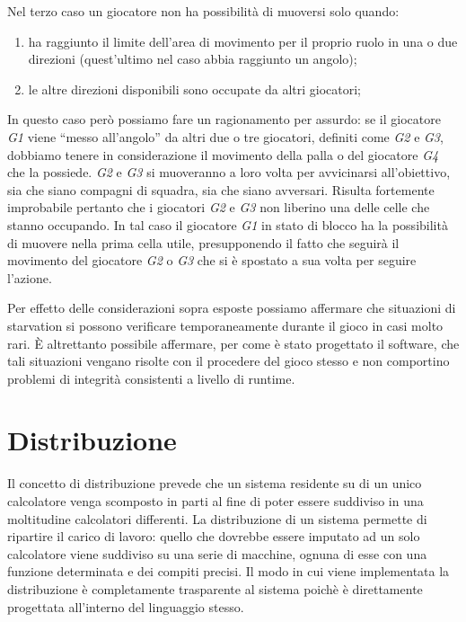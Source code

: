 \documentclass[aps,letterpaper,10pt]{article}
\begin{document}
Nel terzo caso un giocatore non ha possibilit\`a di muoversi solo quando:

\begin{enumerate}
	\item ha raggiunto il limite dell'area di movimento per il proprio ruolo in una o due direzioni (quest'ultimo nel caso abbia raggiunto un angolo);
	\item le altre direzioni disponibili sono occupate da altri giocatori; 
\end{enumerate}

In questo caso per\`o possiamo fare un ragionamento per assurdo: se il giocatore \emph{G1} viene ``messo all'angolo'' da altri due o tre giocatori, definiti come \emph{G2} e \emph{G3}, dobbiamo tenere in considerazione il movimento della palla o del giocatore \emph{G4} che la possiede. \emph{G2} e \emph{G3} si muoveranno a loro volta per avvicinarsi all'obiettivo, sia che siano compagni di squadra, sia che siano avversari. Risulta fortemente improbabile pertanto che i giocatori \emph{G2} e \emph{G3} non liberino una delle celle che stanno occupando. In tal caso il giocatore \emph{G1} in stato di blocco ha la possibilit\`a di muovere nella prima cella utile, presupponendo il fatto che seguir\`a il movimento del giocatore \emph{G2} o \emph{G3} che si \`e spostato a sua volta per seguire l'azione. \vspace{3mm}

Per effetto delle considerazioni sopra esposte possiamo affermare che situazioni di starvation si possono verificare temporaneamente durante il gioco in casi molto rari. \`E altrettanto possibile affermare, per come \`e stato progettato il software, che tali situazioni vengano risolte con il procedere del gioco stesso e non comportino problemi di integrit\`a consistenti a livello di runtime.

\newpage

\section{Distribuzione}

Il concetto di distribuzione prevede che un sistema residente su di un unico calcolatore venga scomposto in parti al fine di poter essere suddiviso in una moltitudine calcolatori differenti. La distribuzione di un sistema permette di ripartire il carico di lavoro: quello che dovrebbe essere imputato ad un solo calcolatore viene suddiviso su una serie di macchine, ognuna di esse con una funzione determinata e dei compiti precisi. Il modo in cui viene implementata la distribuzione \`e completamente trasparente al sistema poich\`e \`e direttamente progettata all'interno del linguaggio stesso. \vspace{3mm}
\end{document}
